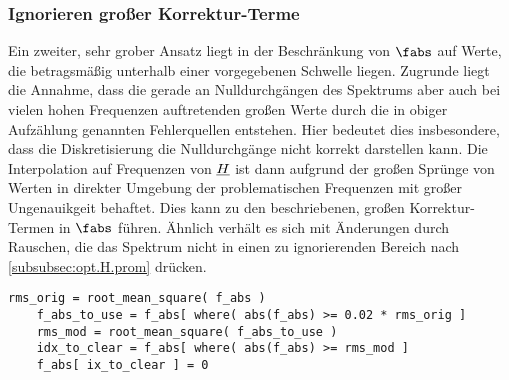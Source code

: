 \documentclass[../Report.tex]{subfiles}
\begin{document}
\subsubsection*{Ignorieren großer Korrektur-Terme}
\label{subsubsec:opt.H.RMS}

Ein zweiter, sehr grober Ansatz liegt in der Beschränkung von $\fabs$ auf Werte, die betragsmäßig unterhalb einer vorgegebenen Schwelle liegen. Zugrunde liegt die Annahme, dass die gerade an Nulldurchgängen des Spektrums aber auch bei vielen hohen Frequenzen auftretenden großen Werte durch die in obiger Aufzählung genannten Fehlerquellen entstehen.
Hier bedeutet dies insbesondere, dass die Diskretisierung die Nulldurchgänge nicht korrekt darstellen kann. Die Interpolation auf Frequenzen von $\underline{H}$ ist dann aufgrund der großen Sprünge von Werten in direkter Umgebung der problematischen Frequenzen mit großer Ungenauikgeit behaftet. Dies kann zu den beschriebenen, großen Korrektur-Termen in $\fabs$ führen. Ähnlich verhält es sich mit Änderungen durch Rauschen, die das Spektrum nicht in einen zu ignorierenden Bereich nach \ref{subsubsec:opt.H.prom} drücken.

\lstset{language=Python}
\begin{lstlisting}[caption={Pseudocode zur Veranschaulichung der Anpassung des Korrekturterms}, label=code:opt.H.pseudoRMS, numbers=none]
	rms_orig = root_mean_square( f_abs )
	f_abs_to_use = f_abs[ where( abs(f_abs) >= 0.02 * rms_orig ] 
	rms_mod = root_mean_square( f_abs_to_use )
	idx_to_clear = f_abs[ where( abs(f_abs) >= rms_mod ] 
	f_abs[ ix_to_clear ] = 0
\end{lstlisting}
\end{document}
